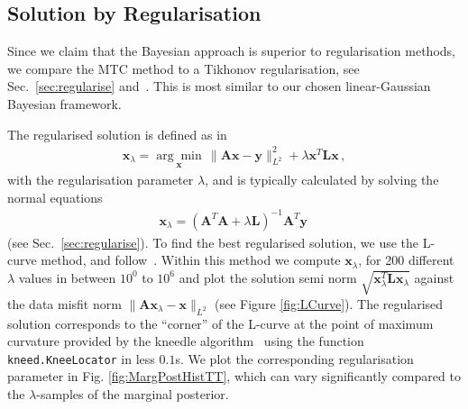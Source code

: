 \subsection{Solution by Regularisation}
\label{sec:reg}
Since we claim that the Bayesian approach is superior to regularisation methods, we compare the MTC method to a Tikhonov regularisation, see Sec.~\ref{sec:regularise} and~\cite{fox2016fast}.
This is most similar to our chosen linear-Gaussian Bayesian framework.

The regularised solution is defined as in~\cite{hansen2010discrete, fox2016fast} 
\begin{align}
	\bm{x}_{\lambda} =\underset{ \bm{x}}{\arg \min}\,  \lVert \bm{A}\bm{x} - \bm{y} \rVert_{L^2}^2 + \lambda \bm{x}^T \bm{L} \bm{x} \, ,
	\label{eq:XLam}
\end{align}
with the regularisation parameter $\lambda$,
and is typically calculated by solving the normal equations
\begin{align}
	\bm{x}_{\lambda} = (\bm{A}^T\bm{A} + \lambda \bm{L} )^{-1} \bm{A}^T \bm{y} \label{eq:xLam} \, 
\end{align}
(see Sec.~\ref{sec:regularise}).
To find the best regularised solution, we use the L-curve method, and follow~\cite{hansen1993use}.
Within this method we compute $\bm{x}_\lambda$, for 200 different $\lambda$ values in between $10^{0}$ to $10^{6}$ and plot the solution semi norm $\sqrt{\bm{x}_\lambda^T\mathbf{L} \bm{x}_\lambda}$ against the data misfit norm $\lVert \bm{A}\bm{x}_\lambda - \bm{x} \rVert_{L^2}$ (see Figure \ref{fig:LCurve}). 
The regularised solution corresponds to the ``corner'' of the L-curve at the point of maximum curvature provided by the kneedle algorithm~\cite{satopaa2011kneedle} using the function \texttt{kneed.KneeLocator} in less $0.1$s.
We plot the corresponding regularisation parameter in Fig. \ref{fig:MargPostHistTT}, which can vary significantly compared to the $\lambda$-samples of the marginal posterior.
